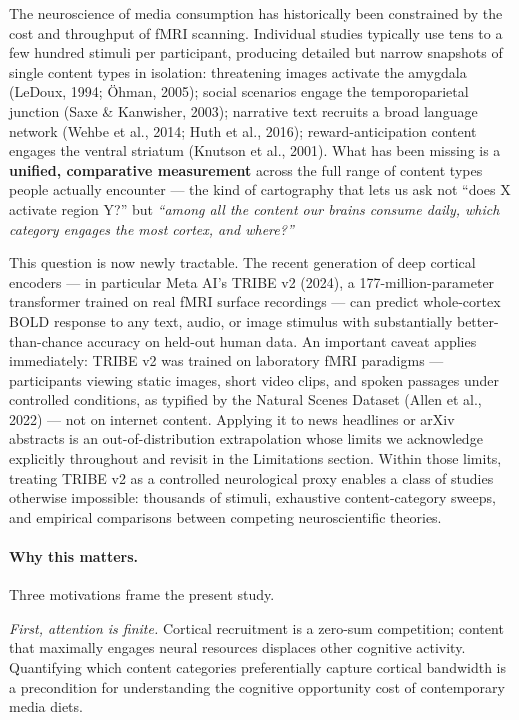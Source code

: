 \documentclass[11pt,letterpaper]{article}
\begin{document}
The neuroscience of media consumption has historically been constrained by the cost and throughput of fMRI scanning. Individual studies typically use tens to a few hundred stimuli per participant, producing detailed but narrow snapshots of single content types in isolation: threatening images activate the amygdala (LeDoux, 1994; \"{O}hman, 2005); social scenarios engage the temporoparietal junction (Saxe \& Kanwisher, 2003); narrative text recruits a broad language network (Wehbe et al., 2014; Huth et al., 2016); reward-anticipation content engages the ventral striatum (Knutson et al., 2001). What has been missing is a \textbf{unified, comparative measurement} across the full range of content types people actually encounter --- the kind of cartography that lets us ask not ``does X activate region Y?'' but \textit{``among all the content our brains consume daily, which category engages the most cortex, and where?''}

This question is now newly tractable. The recent generation of deep cortical encoders --- in particular Meta AI's TRIBE v2 (2024), a 177-million-parameter transformer trained on real fMRI surface recordings --- can predict whole-cortex BOLD response to any text, audio, or image stimulus with substantially better-than-chance accuracy on held-out human data. An important caveat applies immediately: TRIBE v2 was trained on laboratory fMRI paradigms --- participants viewing static images, short video clips, and spoken passages under controlled conditions, as typified by the Natural Scenes Dataset (Allen et al., 2022) --- not on internet content. Applying it to news headlines or arXiv abstracts is an out-of-distribution extrapolation whose limits we acknowledge explicitly throughout and revisit in the Limitations section. Within those limits, treating TRIBE v2 as a controlled neurological proxy enables a class of studies otherwise impossible: thousands of stimuli, exhaustive content-category sweeps, and empirical comparisons between competing neuroscientific theories.

\paragraph{Why this matters.} Three motivations frame the present study.

\textit{First, attention is finite.} Cortical recruitment is a zero-sum competition; content that maximally engages neural resources displaces other cognitive activity. Quantifying which content categories preferentially capture cortical bandwidth is a precondition for understanding the cognitive opportunity cost of contemporary media diets.
\end{document}
